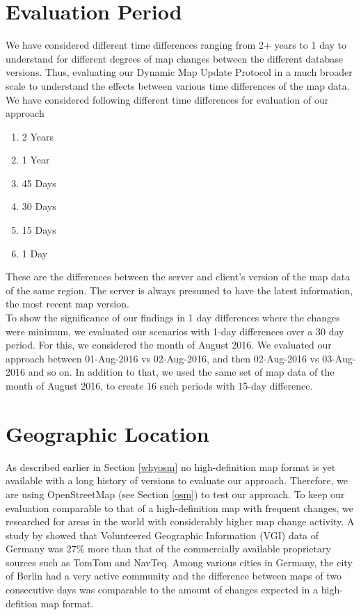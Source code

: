 \section{Evaluation Period} \label{timedifference}
We have considered different time differences ranging from 2+ years to 1 day to understand for different degrees of map changes between the different database versions. Thus, evaluating our Dynamic Map Update Protocol in a much broader scale to understand the effects between various time differences of the map data. We have considered following different time differences for evaluation of our approach \begin{enumerate}
\item 2 Years
\item 1 Year
\item 45 Days
\item 30 Days
\item 15 Days
\item 1 Day
\end{enumerate}
These are the differences between the server and client's version of the map data of the same region. The server is always presumed to have the latest information, the most recent map version. 
\\

To show the significance of our findings in 1 day differences where the changes were minimum, we evaluated our scenarios with 1-day differences over a 30 day period. For this, we considered the month of August 2016. We evaluated our approach between 01-Aug-2016 vs 02-Aug-2016, and then 02-Aug-2016 vs 03-Aug-2016 and so on. In addition to that, we used the same set of map data of the month of August 2016, to create 16 such periods with 15-day difference. 
\section{Geographic Location}
As described earlier in Section \ref{whyosm} no high-definition map format is yet available with a long history of versions to evaluate our approach. Therefore, we are using OpenStreetMap (see Section \ref{osm}) to test our approach. To keep our evaluation comparable to that of a high-definition map with frequent changes, we researched for areas in the world with considerably higher map change activity. A study by \citet{neis2011street} showed that Volunteered Geographic Information (VGI) data of Germany was 27\% more than that of the commercially available proprietary sources such as TomTom and NavTeq. Among various cities in Germany, the city of Berlin had a very active community and the difference between maps of two consecutive days was comparable to the amount of changes expected in a high-defition map format. \\

